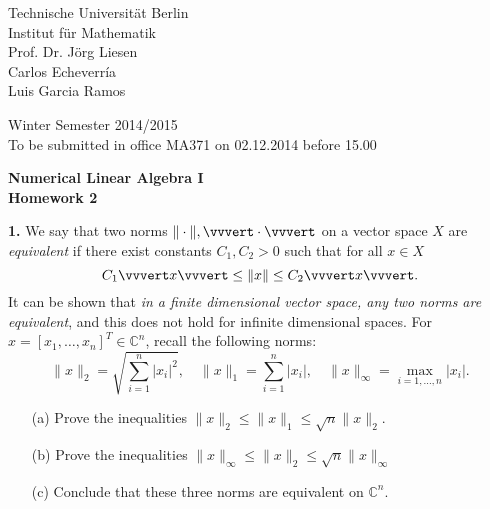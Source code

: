 \documentclass[10pt]{report}
\begin{document}
\begin{minipage}[t]{0.58\textwidth}
Technische Universit\"at Berlin\\
Institut f\"ur Mathematik\\
Prof. Dr. J\"org Liesen\\
Carlos Echeverr\'ia\\
Luis Garcia Ramos
\end{minipage}
\hfill
\begin{minipage}[t]{0.48\textwidth}
\begin{flushright}
Winter Semester 2014/2015\\
To be submitted in office MA371 on 02.12.2014 before 15.00
\end{flushright}
\end{minipage}
\begin{center}
\textbf{{Numerical Linear Algebra I}}\\
\textbf{Homework 2}
\end{center}

\thispagestyle{empty}



\item[\textbf{1.}]
We say that two norms $\| \cdot \|, \vvvert \cdot \vvvert$ on a vector space $X$ are \textit{equivalent} if there exist constants $C_1, C_2 > 0$ such that for all $x \in X$
\[C_1 \vvvert x \vvvert \leq \|x\| \leq  C_2\vvvert x\vvvert.\]
It can be shown that \textit{in a finite dimensional vector space, any two norms are equivalent}, and this does not hold for infinite dimensional spaces. For $x =[x_1, \ldots, x_n]^T \in \mathbb{C}^{n}$, recall the following norms: 
\[
\|x\|_2 =\sqrt{\sum_{i=1}^n |x_i|^2},\quad
\|x\|_1 = \sum_{i=1}^n |x_i|,\quad
\|x\|_{\infty} = \max_{i=1, \ldots,n}|x_i|.
\]
\begin{enumerate}
  \item[(a)] Prove the inequalities $\|x\|_2 \leq \|x\|_1 \leq \sqrt{n}\|x\|_2$.
  \item[(b)]Prove the inequalities $ \|x\|_\infty \leq \|x\|_2 \leq  \sqrt{n}\|x\|_{\infty}$
\item[(c)] Conclude that these three norms are equivalent on $\mathbb{C}^n$.
\end{enumerate}
\vspace{0.4cm} 
\end{document}
